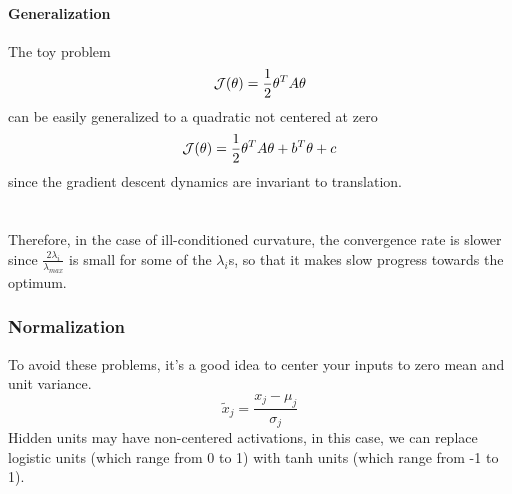 \documentclass[11pt]{article}
\begin{document}
    \paragraph{Generalization}
    The toy problem
    $$\mathcal{J}(\theta) = \frac{1}{2}\theta^TA\theta$$
    can be easily generalized to a quadratic not centered at zero 
    $$\mathcal{J}(\theta) = \frac{1}{2}\theta^TA\theta + b^T\theta + c$$
    since the gradient descent dynamics are invariant to translation.\\\\
    \\
    Therefore, in the case of ill-conditioned curvature, the convergence rate is slower since $\frac{2\lambda_i}{\lambda_{max}}$ is small for some of the $\lambda_i$s, so that it makes slow progress towards the optimum.
    \subsubsection{Normalization}
    To avoid these problems, it's a good idea to center your inputs to zero mean and unit variance.
    $$\tilde{x}_j  = \frac{x_j - \mu_j}{\sigma_j}$$
    Hidden units may have non-centered activations, in this case, we can replace logistic units (which range from 0 to 1) with tanh units (which range from -1 to 1).
    
\end{document}
